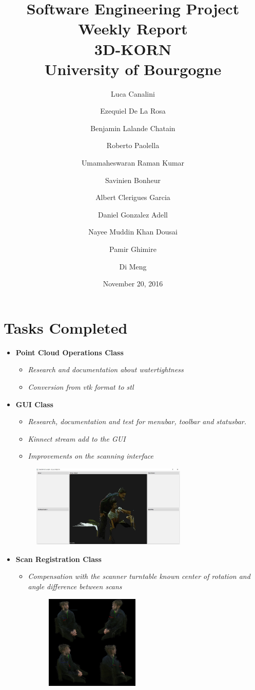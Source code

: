 \documentclass[11pt]{article} %
\title{Software Engineering Project Weekly Report\\ \textbf{3D-KORN} \\ University of Bourgogne}
\author{Luca Canalini \and Ezequiel De La Rosa \and Benjamin Lalande Chatain \and Roberto Paolella \and Umamaheswaran Raman Kumar \and Savinien Bonheur \and Albert Clerigues Garcia \and Daniel Gonzalez Adell \and Nayee Muddin Khan Dousai \and Pamir Ghimire \and Di Meng
}
\date{November 20, 2016} %
\begin{document}
\maketitle
\newpage

\section{Tasks Completed}

\begin{itemize}

\item \textbf{Point Cloud Operations Class}
\begin{itemize}
\item \textit{Research and documentation about watertightness}
\item \textit{Conversion from vtk format to stl}
\end{itemize}

\item \textbf{GUI Class}
\begin{itemize}
\item \textit{Research, documentation and test for menubar, toolbar and statusbar.}
\item \textit{Kinnect stream add to the GUI}
\item \textit{Improvements on the scanning interface}
\end{itemize}

\begin{figure}[h]
\centering
\includegraphics[width=0.7\textwidth]{Scan_Window.png}
\end{figure}

\item \textbf{Scan Registration Class}
\begin{itemize}
\item \textit{Compensation with the scanner turntable known center of rotation and angle difference between scans}

\begin{figure}[h]
\centering
\includegraphics[width=0.45\textwidth]{Scan_Registration.jpg}
\end{figure}


\end{itemize}
\end{itemize}
\end{document}
